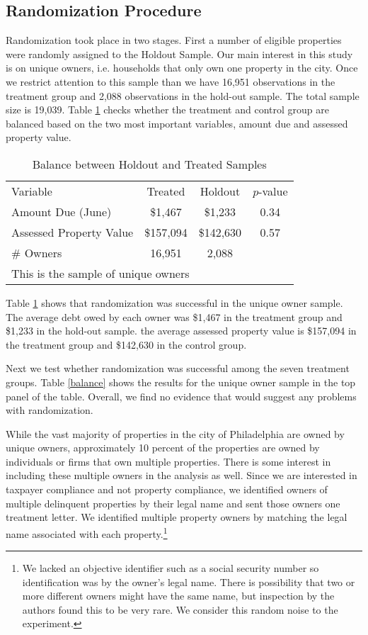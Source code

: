 \documentclass[12pt]{article}
\begin{document}
\subsection{Randomization Procedure}

Randomization took place in two stages.  First a number of eligible
properties were randomly assigned to the Holdout Sample.  Our main
interest in this study is on unique owners, i.e. households that only
own one property in the city. Once we restrict attention to this
sample than we have 16,951 observations in the treatment group and
2,088 observations in the hold-out sample.  The total sample size is
19,039.  Table \ref{bal_hold} checks whether the treatment and control
group are balanced based on the two most important variables, amount
due and assessed property value.

\begin{table}[ht]
\centering
\caption{Balance between Holdout and Treated Samples}\label{bal_hold}
\bigskip
\begin{tabular}{l  c c c}
\hline
Variable & Treated & Holdout & $p$-value \\ 
Amount Due (June) & \$1,467 & \$1,233 & 0.34 \\ 
Assessed Property Value  & \$157,094 & \$142,630 & 0.57 \\ 
\# Owners  & 16,951 & 2,088 &  \\ 
\hline
\multicolumn{4}{l}{This is the sample of unique owners} \\
\hline
\end{tabular}
\end{table}

Table \ref{bal_hold} shows that randomization was successful in the
unique owner sample.  The average debt owed by each owner was \$1,467
in the treatment group and \$1,233 in the hold-out sample. the average
assessed property value is \$157,094 in the treatment group and
\$142,630 in the control group.

Next we test whether randomization was successful among the seven
treatment groups. Table \ref{balance} shows the results for the unique
owner sample in the top panel of the table. Overall, we find no
evidence that would suggest any problems with randomization.

While the vast majority of properties in the city of Philadelphia are
owned by unique owners, approximately 10 percent of the properties are
owned by individuals or firms that own multiple properties. There is
some interest in including these multiple owners in the analysis as
well. Since we are interested in taxpayer compliance and not property
compliance, we identified owners of multiple delinquent properties by
their legal name and sent those owners one treatment letter.  We
identified multiple property owners by matching the legal name
associated with each property.\footnote{We lacked an objective
  identifier such as a social security number so identification was by
  the owner's legal name.  There is possibility that two or more
  different owners might have the same name, but inspection by the
  authors found this to be very rare.  We consider this random noise
  to the experiment.}
\end{document}

